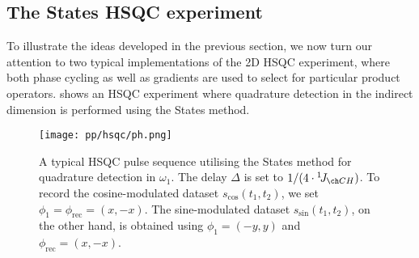 \subsection{The States HSQC experiment}
\label{subsec:theory__hsqc_states}

To illustrate the ideas developed in the previous section, we now turn our attention to two typical implementations of the 2D HSQC experiment, where both phase cycling as well as gradients are used to select for particular product operators.
 shows an HSQC experiment where quadrature detection in the indirect dimension is performed using the States method.

\begin{figure}[htbp]
    \centering
    \texttt{[image: pp/hsqc/ph.png]}
    \caption[Phase-sensitive HSQC pulse sequence with States method]{
        A typical HSQC pulse sequence utilising the States method for quadrature detection in $\omega_1$.
        The delay $\Delta$ is set to $1/(4 \cdot \oneJ{CH})$.
        To record the cosine-modulated dataset $s_\text{cos}(t_1, t_2)$, we set $\phi_1 = \phi_\text{rec} = (x, -x)$.
        The sine-modulated dataset $s_\text{sin}(t_1, t_2)$, on the other hand, is obtained using $\phi_1 = (-y, y)$ and $\phi_\text{rec} = (x, -x)$.
    }
    \label{fig:hsqc_ph}
\end{figure}

